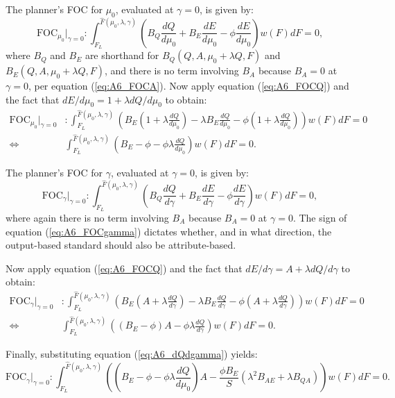 \documentclass[12pt]{article}
\begin{document}
The planner's FOC for $\mu_0$, evaluated at $\gamma=0$, is given by:
\begin{equation}
\text{FOC}_{\mu_0}|_{\gamma=0}:\int_{F_L}^{\hat{F}(\mu_0,\lambda,\gamma)}\left(B_Q\frac{dQ}{d\mu_0} +B_E\frac{dE}{d\mu_0} -\phi\frac{dE}{d\mu_0}\right)w(F)dF = 0, \label{eq:A6_FOCmu}
\end{equation}
\noindent where $B_Q$ and $B_E$ are shorthand for $B_Q(Q,A,\mu_0+\lambda Q,F)$ and $B_E(Q,A,\mu_0+\lambda Q,F)$, and there is no term involving $B_A$ because $B_A=0$ at $\gamma=0$, per equation (\ref{eq:A6_FOCA}). Now apply equation (\ref{eq:A6_FOCQ}) and the fact that $dE/d\mu_0 = 1 + \lambda dQ/d\mu_0$ to obtain:
\begin{align}
\text{FOC}_{\mu_0}|_{\gamma=0}&:\int_{F_L}^{\hat{F}(\mu_0,\lambda,\gamma)}\left(B_E(1+\lambda\frac{dQ}{d\mu_0}) - \lambda B_E\frac{dQ}{d\mu_0} -\phi(1+\lambda\frac{dQ}{d\mu_0})\right)w(F)dF = 0  \\
\Leftrightarrow &\int_{F_L}^{\hat{F}(\mu_0,\lambda,\gamma)}\left(B_E-\phi-\phi\lambda\frac{dQ}{d\mu_0}\right)w(F)dF = 0. \label{eq:A6_FOCmu2}
\end{align}

The planner's FOC for $\gamma$, evaluated at $\gamma=0$, is given by:
\begin{equation}
\text{FOC}_{\gamma}|_{\gamma=0}:\int_{F_L}^{\hat{F}(\mu_0,\lambda,\gamma)}\left(B_Q\frac{dQ}{d\gamma} +B_E\frac{dE}{d\gamma} -\phi\frac{dE}{d\gamma}\right)w(F)dF = 0, \label{eq:A6_FOCgamma}
\end{equation}
\noindent where again there is no term involving $B_A$ because $B_A=0$ at $\gamma=0$. The sign of equation (\ref{eq:A6_FOCgamma}) dictates whether, and in what direction, the output-based standard should also be attribute-based.

Now apply equation (\ref{eq:A6_FOCQ}) and the fact that $dE/d\gamma = A + \lambda dQ/d\gamma$ to obtain:
\begin{align}
\text{FOC}_{\gamma}|_{\gamma=0}&:\int_{F_L}^{\hat{F}(\mu_0,\lambda,\gamma)}\left(B_E(A+\lambda\frac{dQ}{d\gamma}) - \lambda B_E\frac{dQ}{d\gamma} -\phi(A+\lambda\frac{dQ}{d\gamma})\right)w(F)dF = 0 \\
\Leftrightarrow &\int_{F_L}^{\hat{F}(\mu_0,\lambda,\gamma)}\left((B_E-\phi)A - \phi\lambda   \frac{dQ}{d\gamma} \right)w(F)dF = 0. \label{eq:A6_FOCgamma2}
\end{align}

Finally, substituting equation (\ref{eq:A6_dQdgamma}) yields:
\begin{equation}
\text{FOC}_{\gamma}|_{\gamma=0}:\int_{F_L}^{\hat{F}(\mu_0,\lambda,\gamma)}\left(\left(B_E-\phi-\phi\lambda\frac{dQ}{d\mu_0}\right)A - \frac{\phi B_E}{S}(\lambda^2B_{AE}+\lambda B_{QA})\right)w(F)dF = 0. \label{eq:A6_FOCgamma3}
\end{equation}
\end{document}
